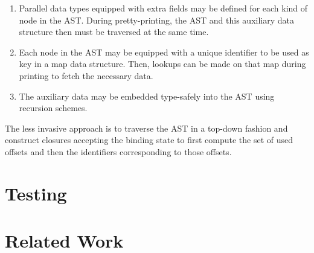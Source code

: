 \begin{enumerate}
\item
Parallel data types equipped with extra fields may be defined for each kind of node in the \ac{AST}.
During pretty-printing, the \ac{AST} and this auxiliary data structure then must be traversed at the same time.
\item
Each node in the \ac{AST} may be equipped with a unique identifier to be used as key in a map data structure.
Then, lookups can be made on that map during printing to fetch the necessary data.
\item
The auxiliary data may be embedded type-safely into the \ac{AST} using recursion schemes.
\end{enumerate}

The less invasive approach is to traverse the \ac{AST} in a top-down fashion and construct closures accepting the binding state to first compute the set of used offsets and then the identifiers corresponding to those offsets.


\section{Testing}


\section{Related Work}
